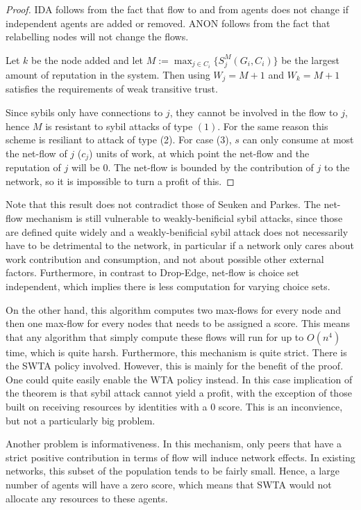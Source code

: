 \documentclass[a4paper,11pt]{book}
\theoremstyle{definition}
\begin{document}
\begin{proof}
    IDA follows from the fact that flow to and from agents does not change if independent agents
    are added or removed. ANON follows from the fact that relabelling nodes will not change the flows.

    Let $k$ be the node added and let 
    $M := \max_{j \in C_i}\{S^M_j(G_i, C_i)\}$ be the largest amount of reputation in the system.
    Then using $W_j = M+1$ and $W_k = M+1$ satisfies the requirements of weak transitive trust.

    Since sybils only have connections to $j$, they cannot be involved in the flow to $j$, hence
    $M$ is resistant to sybil attacks of type $(1)$. For the same reason this scheme is resiliant
    to attack of type (2). For case (3), $s$ can only consume at most the net-flow of $j$ ($c_j$)
    units of work, at which point the net-flow and the reputation of $j$ will be $0$. The net-flow
    is bounded by the contribution of $j$ to the network, so it is impossible to turn a profit of this.
\end{proof}

Note that this result does not contradict those of Seuken and Parkes. The net-flow mechanism is
still vulnerable to weakly-benificial sybil attacks, since those are defined quite widely and
a weakly-benificial sybil attack does not necessarily have to be detrimental to the network,
in particular if a network only cares about work contribution and consumption, and
not about possible other external factors. Furthermore, in contrast to Drop-Edge, net-flow
is choice set independent, which implies there is less computation for varying choice sets.



On the other hand, this algorithm computes two max-flows for every node and then one max-flow for
every nodes that needs to be assigned a score. This means that any algorithm that simply compute
these flows will run for up to $O(n^4)$ time, which is quite harsh. 
Furthermore, this mechanism is quite strict. There is the SWTA policy involved. However,
this is mainly for the benefit of the proof. One could quite easily enable the WTA policy instead.
In this case implication of the theorem is that sybil attack cannot yield a profit, with the exception
of those built on receiving resources by identities with a $0$ score. This is an inconvience,
but not a particularly big problem. 

Another problem is informativeness. In this mechanism,
only peers that have a strict positive contribution in terms of flow will induce network effects.
In existing networks, this subset of the population tends to be fairly small. Hence, a large
number of agents will have a zero score, which means that SWTA would not allocate any resources
to these agents.
\end{document}

